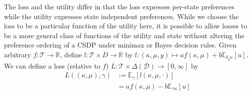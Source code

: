 The loss and the utility differ in that the loss expresses per-state preferences while the utility expresses state independent preferences. While we choose the loss to be a particular function of the utility here, it is possible to allow losses to be a more general class of functions of the utility and state without altering the preference ordering of a CSDP under minimax or Bayes decision rules. Given arbitrary $f:\mathscr{T}\to\mathbb{R}$, define $l:\mathscr{T}\times D\to \mathbb{R}$ by $l:(\kappa,\mu,y)\mapsto a f(\kappa,\mu) + b \mathbb{E}_{\delta_y\kappa}[u]$. We can define a loss (relative to $f$) $L:\mathscr{T}\times\Delta(\mathcal{D})\to [0,\infty]$ by
\begin{align}
    L((\kappa,\mu),\gamma) &:= \mathbb{E}_\gamma[l(\kappa,\mu,\cdot)]\\
    					   &= a f(\kappa,\mu) - b \mathbb{E}_{\gamma\kappa}[u]\label{eq:canonical_loss}\\
\end{align}
